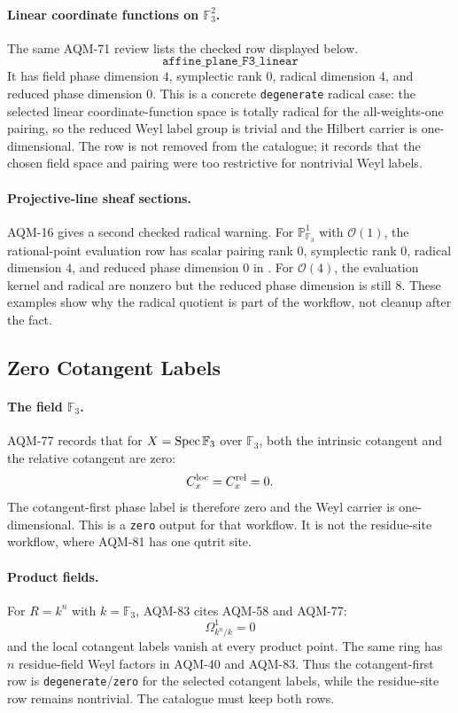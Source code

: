 \paragraph{Linear coordinate functions on \(\mathbb F_3^2\).}
The same AQM-71 review lists the checked row displayed below.
\[
  \texttt{affine\_plane\_F3\_linear}
\]
It has field phase dimension \(4\),
symplectic rank \(0\), radical dimension \(4\), and reduced phase dimension
\(0\).  This is a concrete \texttt{degenerate} radical case: the selected
linear coordinate-function space is totally radical for the all-weights-one
pairing, so the reduced Weyl label group is trivial and the Hilbert carrier
is one-dimensional.  The row is not removed from the catalogue; it records
that the chosen field space and pairing were too restrictive for nontrivial
Weyl labels.

\paragraph{Projective-line sheaf sections.}
AQM-16 gives a second checked radical warning.  For
\(\mathbb P^1_{\mathbb F_3}\) with \(\mathcal O(1)\), the rational-point
evaluation row has scalar pairing rank \(0\), symplectic rank \(0\), radical
dimension \(4\), and reduced phase dimension \(0\) in
.
For \(\mathcal O(4)\), the evaluation kernel and radical are nonzero but the
reduced phase dimension is still \(8\).  These examples show why the radical
quotient is part of the workflow, not cleanup after the fact.

\subsection{Zero Cotangent Labels}

\paragraph{The field \(\mathbb F_3\).}
AQM-77 records that for \(X=\operatorname{Spec}\mathbb F_3\) over
\(\mathbb F_3\), both the intrinsic cotangent and the relative cotangent are
zero:
\[
  C_x^{\rm loc}=C_x^{\rm rel}=0 .
\]
The cotangent-first phase label is therefore zero and the Weyl carrier is
one-dimensional.  This is a \texttt{zero} output for that workflow.  It is
not the residue-site workflow, where AQM-81 has one qutrit site.

\paragraph{Product fields.}
For \(R=k^n\) with \(k=\mathbb F_3\), AQM-83 cites AQM-58 and AQM-77:
\[
  \Omega^1_{k^n/k}=0
\]
and the local cotangent labels vanish at every product point.  The same ring
has \(n\) residue-field Weyl factors in AQM-40 and AQM-83.  Thus the
cotangent-first row is \texttt{degenerate}/\texttt{zero} for the selected
cotangent labels, while the residue-site row remains nontrivial.  The
catalogue must keep both rows.

